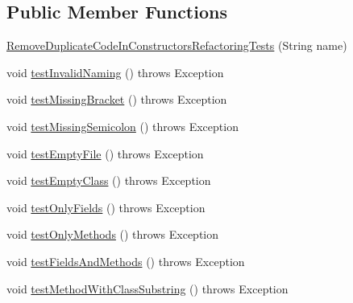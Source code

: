 \subsection*{Public Member Functions}
\begin{DoxyCompactItemize}
\item 
\hyperlink{classedu_1_1illinois_1_1canistelCassabanana_1_1tests_1_1RemoveDuplicateCodeInConstructorsRefactoringTests_ade9db394415373c643268437e7c8abb0}{RemoveDuplicateCodeInConstructorsRefactoringTests} (String name)
\item 
void \hyperlink{classedu_1_1illinois_1_1canistelCassabanana_1_1tests_1_1RemoveDuplicateCodeInConstructorsRefactoringTests_a1b59306010bf23a70f306598952f49d5}{testInvalidNaming} ()  throws Exception 
\item 
void \hyperlink{classedu_1_1illinois_1_1canistelCassabanana_1_1tests_1_1RemoveDuplicateCodeInConstructorsRefactoringTests_a9e42bf5e1bae5f24afe8fe8b12c5b0e5}{testMissingBracket} ()  throws Exception 
\item 
void \hyperlink{classedu_1_1illinois_1_1canistelCassabanana_1_1tests_1_1RemoveDuplicateCodeInConstructorsRefactoringTests_a46aca0909bcf32882ed69af631b83dfa}{testMissingSemicolon} ()  throws Exception 
\item 
void \hyperlink{classedu_1_1illinois_1_1canistelCassabanana_1_1tests_1_1RemoveDuplicateCodeInConstructorsRefactoringTests_a6a874baa9f9b327abe88b9a599f1a46d}{testEmptyFile} ()  throws Exception 
\item 
void \hyperlink{classedu_1_1illinois_1_1canistelCassabanana_1_1tests_1_1RemoveDuplicateCodeInConstructorsRefactoringTests_a15a8e048be125c3bc2b6b3c075ac8503}{testEmptyClass} ()  throws Exception 
\item 
void \hyperlink{classedu_1_1illinois_1_1canistelCassabanana_1_1tests_1_1RemoveDuplicateCodeInConstructorsRefactoringTests_a804acf9c60fe63b8c96cddd1f5a50d0c}{testOnlyFields} ()  throws Exception 
\item 
void \hyperlink{classedu_1_1illinois_1_1canistelCassabanana_1_1tests_1_1RemoveDuplicateCodeInConstructorsRefactoringTests_aaf2a80565ccea1064625a25fc8094acb}{testOnlyMethods} ()  throws Exception 
\item 
void \hyperlink{classedu_1_1illinois_1_1canistelCassabanana_1_1tests_1_1RemoveDuplicateCodeInConstructorsRefactoringTests_ad3b950b7b16af3f6d42d760606a36041}{testFieldsAndMethods} ()  throws Exception 
\item 
void \hyperlink{classedu_1_1illinois_1_1canistelCassabanana_1_1tests_1_1RemoveDuplicateCodeInConstructorsRefactoringTests_afd3a3614e763667c4cb37a707997dac6}{testMethodWithClassSubstring} ()  throws Exception 

\end{DoxyCompactItemize}
